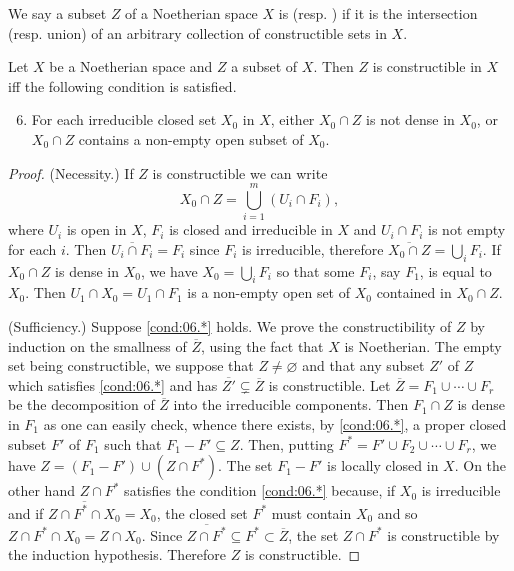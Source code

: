 \documentclass[../main]{subfiles}
\begin{document}
We say a subset $Z$ of a Noetherian space $X$ is  (resp. ) if it is the intersection (resp. union) of an arbitrary collection of constructible sets in $X$.

\begin{parproposition}\label{pro:06.01}
Let $X$ be a Noetherian space and $Z$ a subset of $X$. Then $Z$ is constructible in $X$ iff the following condition is satisfied.
\begin{enumerate}[label = (\arabic*.$\ast$)]\setcounter{enumi}{5}
\item\label{cond:06.*} For each irreducible closed set $X_0$ in $X$, either $X_0 \cap Z$ is not dense in $X_0$, or $X_0 \cap Z$ contains a non-empty open subset of $X_0$.

\end{enumerate}
\end{parproposition}

\begin{proof}
(Necessity.) If $Z$ is constructible we can write
\[
X_0 \cap Z = \bigcup_{i=1} ^m (U_i \cap F_i),
\]
where $U_i$ is open in $X$, $F_i$ is closed and irreducible in $X$ and $U_i \cap F_i$ is not empty for each $i$. Then $\overline{U_i \cap F_i} = F_i$ since $F_i$ is irreducible, therefore $\overline{X_0 \cap Z} = \bigcup_i F_i$. If $X_0 \cap Z$ is dense in $X_0$, we have $X_0 = \bigcup_i F_i$ so that some $F_i$, say $F_1$, is equal to $X_0$. Then $U_1 \cap X_0 = U_1 \cap F_1$ is a non-empty open set of $X_0$ contained in $X_0 \cap Z$.

(Sufficiency.) Suppose \ref{cond:06.*} holds. We prove the constructibility of $Z$ by induction on the smallness of $\overline{Z}$, using the fact that $X$ is Noetherian. The empty set being constructible, we suppose that $Z \ne \varnothing$ and that any subset $Z'$ of $Z$ which satisfies \ref{cond:06.*} and has $\overline{Z'}\subsetneq\overline{Z}$ is constructible. Let $\overline{Z} = F_1 \cup \cdots \cup F_r$ be the decomposition of $\overline{Z}$ into the irreducible components. Then $F_1 \cap Z$ is dense in $F_1$ as one can easily check, whence there exists, by \ref{cond:06.*}, a proper closed subset $F'$ of $F_1$ such that $F_1 - F' \subseteq Z$. Then, putting $F^* = F' \cup F_2 \cup \cdots \cup F_r$, we have $Z= (F_1 - F') \cup (Z \cap F^*)$. The set $F_1 - F'$ is locally closed in $X$. On the other hand $Z \cap F^*$ satisfies the condition \ref{cond:06.*} because, if $X_0$ is irreducible and if $\overline{Z \cap F^* \cap X_0} = X_0$, the closed set $F^*$ must contain $X_0$ and so $Z \cap F^* \cap X_0 = Z \cap X_0$. Since $\overline{Z \cap F^*} \subseteq F^* \subset \overline{Z}$, the set $Z \cap F^*$ is constructible by the induction hypothesis. Therefore $Z$ is constructible.
\end{proof}
\end{document}
